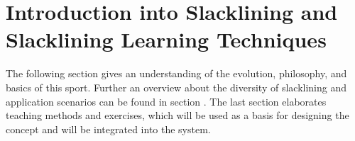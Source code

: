 \chapter{Introduction into Slacklining and Slacklining Learning Techniques}\label{3_slacklining}
The following section \textit{} gives an understanding of the evolution, philosophy, and basics of this sport. Further an overview about the diversity of slacklining and application scenarios can be found in section \textit{}. The last section \textit{} elaborates teaching methods and exercises, which will be used as a basis for designing the concept and will be integrated into the system.
 
  
  
 
  
